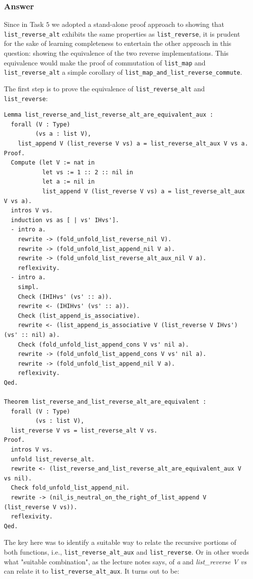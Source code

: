 \documentclass{article}
\begin{document}
\subsubsection{Answer}
Since in Task $5$ we adopted a stand-alone proof approach to showing that \texttt{list\_reverse\_alt} exhibits the same properties as \texttt{list\_reverse}, it is prudent for the sake of learning completeness to entertain the other approach in this question: showing the equivalence of the two reverse implementations. This equivalence would make the proof of commutation of \texttt{list\_map} and \texttt{list\_reverse\_alt} a simple corollary of \texttt{list\_map\_and\_list\_reverse\_commute}.

The first step is to prove the equivalence of \texttt{list\_reverse\_alt} and \texttt{list\_reverse}:

\begin{lstlisting}
Lemma list_reverse_and_list_reverse_alt_are_equivalent_aux :
  forall (V : Type)
         (vs a : list V),
    list_append V (list_reverse V vs) a = list_reverse_alt_aux V vs a.
Proof.
  Compute (let V := nat in
           let vs := 1 :: 2 :: nil in
           let a := nil in
           list_append V (list_reverse V vs) a = list_reverse_alt_aux V vs a).
  intros V vs.
  induction vs as [ | vs' IHvs'].
  - intro a. 
    rewrite -> (fold_unfold_list_reverse_nil V).
    rewrite -> (fold_unfold_list_append_nil V a).
    rewrite -> (fold_unfold_list_reverse_alt_aux_nil V a).
    reflexivity.
  - intro a.
    simpl.
    Check (IHIHvs' (vs' :: a)).
    rewrite <- (IHIHvs' (vs' :: a)).
    Check (list_append_is_associative).
    rewrite <- (list_append_is_associative V (list_reverse V IHvs') (vs' :: nil) a).
    Check (fold_unfold_list_append_cons V vs' nil a).
    rewrite -> (fold_unfold_list_append_cons V vs' nil a).
    rewrite -> (fold_unfold_list_append_nil V a).
    reflexivity.
Qed.

Theorem list_reverse_and_list_reverse_alt_are_equivalent :
  forall (V : Type)
         (vs : list V),
  list_reverse V vs = list_reverse_alt V vs.
Proof.
  intros V vs.
  unfold list_reverse_alt.
  rewrite <- (list_reverse_and_list_reverse_alt_are_equivalent_aux V vs nil).
  Check fold_unfold_list_append_nil.
  rewrite -> (nil_is_neutral_on_the_right_of_list_append V (list_reverse V vs)).
  reflexivity.
Qed.
\end{lstlisting}
 
The key here was to identify a suitable way to relate the recursive portions of both functions, i.e., \texttt{list\_reverse\_alt\_aux} and \texttt{list\_reverse}. Or in other words what "suitable combination", as the lecture notes says, of \textit{a} and \textit{list\_reverse V vs} can relate it to \texttt{list\_reverse\_alt\_aux}.  It turns out to be:
\end{document}
